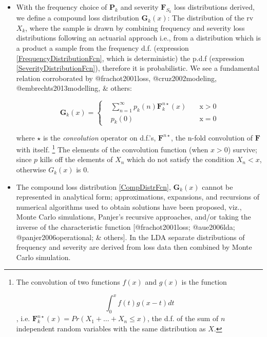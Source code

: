 \documentclass{DissertateUSU}
\begin{document}
\begin{itemize}
\item With the frequency choice of $\mathbf{P}_k$ and severity $\mathbf{F}_{S_k}$ loss distributions derived, we define a compound loss distribution $\mathbf{G}_k(x)$: The distribution of the rv $X_k$, where the sample is drawn by combining frequency and severity loss distributions following an actuarial approach i.e., from a distribution which is a product a sample from the frequency d.f. (expression \ref{FrequencyDistributionFcn}, which is deterministic) the p.d.f (expression \ref{SeverityDistributionFcn}), therefore it is probabilistic. We see a fundamental relation corroborated by @frachot2001loss, @cruz2002modeling, @embrechts2013modelling, \& others:

\singlespacing
\begin{equation}\label{CompDistrFcn}
\mathbf{G}_{k}(x)=\left\{\begin{array}{rcl}
                 &\sum_{n=1}^{\infty} p_k(n)\mathbf{F}_k^{n\star}(x) \quad  &\mbox{x} > 0 \\
                  &p_k(0) \quad  &\mbox{x}=0 
                 \end{array}\right.
\end{equation}
\doublespacing

where $\star$ is the \emph{convolution} operator on d.f.'s, $\mathbf{F}^{n\star}$, the n-fold convolution of $\mathbf{F}$ with itself. \footnote{The convolution of two functions $f(x)$ and $g(x)$ is the function

\singlespacing
\begin{equation}\label{Convolution}
\int_{0}^{x}f(t)g(x-t)dt
\end{equation}
\doublespacing , i.e. $\mathbf{F}_{k}^{n\star}(x)=Pr(X_1 + \ldots + X_n \leq x)$, the d.f. of the sum of $n$ independent random variables with the same distribution as $X$.} The elements of the convolution function (when $x > 0$) survive; since $p$ kills off the elements of $X_n$ which do not satisfy the condition $X_n <x$, otherwise ${G}_{k}(x)$ is $0$.  

\item The compound loss distribution \ref{CompDistrFcn}, $\mathbf{G}_{k}(x)$ cannot be represented in analytical form; approximations, expansions, and recursions of numerical algorithms used to obtain solutions have been proposed, viz., Monte Carlo simulations, Panjer's recursive approaches, and/or taking the inverse of the characteristic function [@frachot2001loss; @aue2006lda; @panjer2006operational; \& others]. In the LDA separate distributions of frequency and severity are derived from loss data then combined by Monte Carlo simulation. \medskip


\end{itemize}
\end{document}
